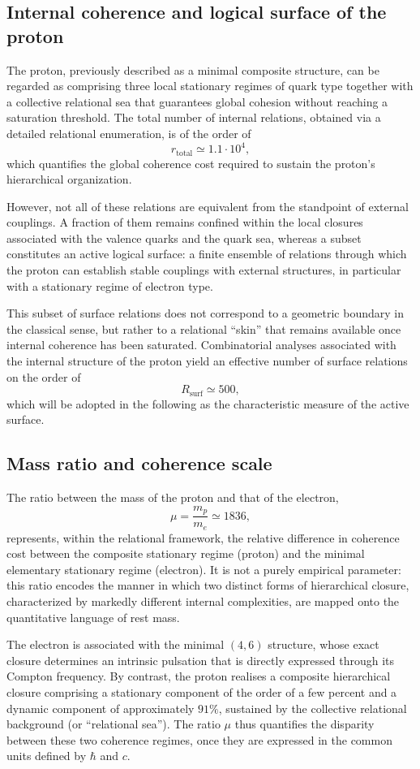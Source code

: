 \documentclass[11pt,a4paper]{article}
\begin{document}
\subsection{Internal coherence and logical surface of the proton}

The proton, previously described as a minimal composite structure, can be regarded as comprising three local stationary regimes of quark type together with a collective relational sea that guarantees global cohesion without reaching a saturation threshold. The total number of internal relations, obtained via a detailed relational enumeration, is of the order of
\[
r_{\mathrm{total}} \simeq 1.1 \cdot 10^{4},
\]
which quantifies the global coherence cost required to sustain the proton’s hierarchical organization.

However, not all of these relations are equivalent from the standpoint of external couplings. A fraction of them remains confined within the local closures associated with the valence quarks and the quark sea, whereas a subset constitutes an active logical surface: a finite ensemble of relations through which the proton can establish stable couplings with external structures, in particular with a stationary regime of electron type.

This subset of surface relations does not correspond to a geometric boundary in the classical sense, but rather to a relational “skin” that remains available once internal coherence has been saturated. Combinatorial analyses associated with the internal structure of the proton yield an effective number of surface relations on the order of
\[
R_{\mathrm{surf}} \simeq 500,
\]
which will be adopted in the following as the characteristic measure of the active surface.

\subsection{Mass ratio and coherence scale}
The ratio between the mass of the proton and that of the electron,
\[
\mu = \frac{m_p}{m_e} \simeq 1836,
\]
represents, within the relational framework, the relative difference in coherence cost between the composite stationary regime (proton) and the minimal elementary stationary regime (electron). It is not a purely empirical parameter: this ratio encodes the manner in which two distinct forms of hierarchical closure, characterized by markedly different internal complexities, are mapped onto the quantitative language of rest mass. 

The electron is associated with the minimal \((4,6)\) structure, whose exact closure determines an intrinsic pulsation that is directly expressed through its Compton frequency. By contrast, the proton realises a composite hierarchical closure comprising a stationary component of the order of a few percent and a dynamic component of approximately \(91\%\), sustained by the collective relational background (or “relational sea”). The ratio \(\mu\) thus quantifies the disparity between these two coherence regimes, once they are expressed in the common units defined by \(\hbar\) and \(c\).
\end{document}
